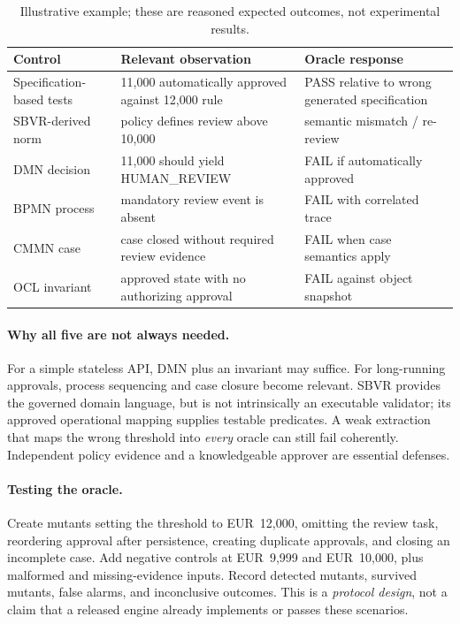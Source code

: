 \documentclass[11pt,a4paper]{article}
\newcommand{\PASS}{\textsf{PASS}}
\newcommand{\FAIL}{\textsf{FAIL}}
\begin{document}
\begin{table}[htbp]
\centering\small
\caption{Illustrative example; these are reasoned expected outcomes, not experimental results.}
\begin{tabularx}{\linewidth}{@{}p{32mm}X X@{}}
\toprule
Control & Relevant observation & Oracle response \\
\midrule
Specification-based tests & 11,000 automatically approved against 12,000 rule & \PASS{} relative to wrong generated specification \\
SBVR-derived norm & policy defines review above 10,000 & semantic mismatch / re-review \\
DMN decision & 11,000 should yield \textsf{HUMAN\_REVIEW} & \FAIL{} if automatically approved \\
BPMN process & mandatory review event is absent & \FAIL{} with correlated trace \\
CMMN case & case closed without required review evidence & \FAIL{} when case semantics apply \\
OCL invariant & approved state with no authorizing approval & \FAIL{} against object snapshot \\
\bottomrule
\end{tabularx}
\label{tab:example}
\end{table}

\paragraph{Why all five are not always needed.} For a simple stateless API, DMN plus an invariant may suffice. For long-running approvals, process sequencing and case closure become relevant. SBVR provides the governed domain language, but is not intrinsically an executable validator; its approved operational mapping supplies testable predicates. A weak extraction that maps the wrong threshold into \emph{every} oracle can still fail coherently. Independent policy evidence and a knowledgeable approver are essential defenses.

\paragraph{Testing the oracle.} Create mutants setting the threshold to EUR~12,000, omitting the review task, reordering approval after persistence, creating duplicate approvals, and closing an incomplete case. Add negative controls at EUR~9,999 and EUR~10,000, plus malformed and missing-evidence inputs. Record detected mutants, survived mutants, false alarms, and inconclusive outcomes. This is a \emph{protocol design}, not a claim that a released engine already implements or passes these scenarios.
\end{document}
